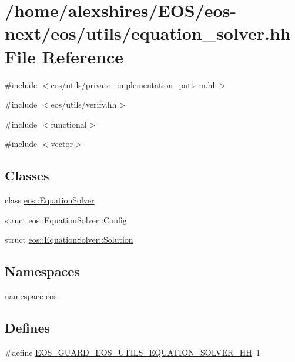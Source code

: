 \hypertarget{equation__solver_8hh}{
\section{/home/alexshires/EOS/eos-\/next/eos/utils/equation\_\-solver.hh File Reference}
\label{equation__solver_8hh}
}
{\ttfamily \#include $<$eos/utils/private\_\-implementation\_\-pattern.hh$>$}\par
{\ttfamily \#include $<$eos/utils/verify.hh$>$}\par
{\ttfamily \#include $<$functional$>$}\par
{\ttfamily \#include $<$vector$>$}\par
\subsection*{Classes}
\begin{DoxyCompactItemize}
\item 
class \hyperlink{classeos_1_1EquationSolver}{eos::EquationSolver}
\item 
struct \hyperlink{structeos_1_1EquationSolver_1_1Config}{eos::EquationSolver::Config}
\item 
struct \hyperlink{structeos_1_1EquationSolver_1_1Solution}{eos::EquationSolver::Solution}
\end{DoxyCompactItemize}
\subsection*{Namespaces}
\begin{DoxyCompactItemize}
\item 
namespace \hyperlink{namespaceeos}{eos}
\end{DoxyCompactItemize}
\subsection*{Defines}
\begin{DoxyCompactItemize}
\item 
\#define \hyperlink{equation__solver_8hh_ac6e4af9e53b8a73b6f7b03ad0c6fdb93}{EOS\_\-GUARD\_\-EOS\_\-UTILS\_\-EQUATION\_\-SOLVER\_\-HH}~1
\end{DoxyCompactItemize}


